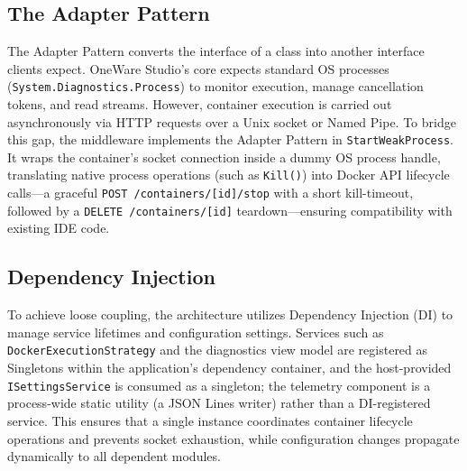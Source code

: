 \subsection{The Adapter Pattern}
The Adapter Pattern converts the interface of a class into another interface clients expect. OneWare Studio's core expects standard OS processes (\texttt{System.Diagnostics.Process}) to monitor execution, manage cancellation tokens, and read streams. However, container execution is carried out asynchronously via HTTP requests over a Unix socket or Named Pipe. To bridge this gap, the middleware implements the Adapter Pattern in \texttt{StartWeakProcess}. It wraps the container's socket connection inside a dummy OS process handle, translating native process operations (such as \texttt{Kill()}) into Docker API lifecycle calls---a graceful \texttt{POST /containers/[id]/stop} with a short kill-timeout, followed by a \texttt{DELETE /containers/[id]} teardown---ensuring compatibility with existing IDE code.

\subsection{Dependency Injection}
To achieve loose coupling, the architecture utilizes Dependency Injection (DI) to manage service lifetimes and configuration settings. Services such as \texttt{DockerExecutionStrategy} and the diagnostics view model are registered as Singletons within the application's dependency container, and the host-provided \texttt{ISettingsService} is consumed as a singleton; the telemetry component is a process-wide static utility (a JSON Lines writer) rather than a DI-registered service. This ensures that a single instance coordinates container lifecycle operations and prevents socket exhaustion, while configuration changes propagate dynamically to all dependent modules.


